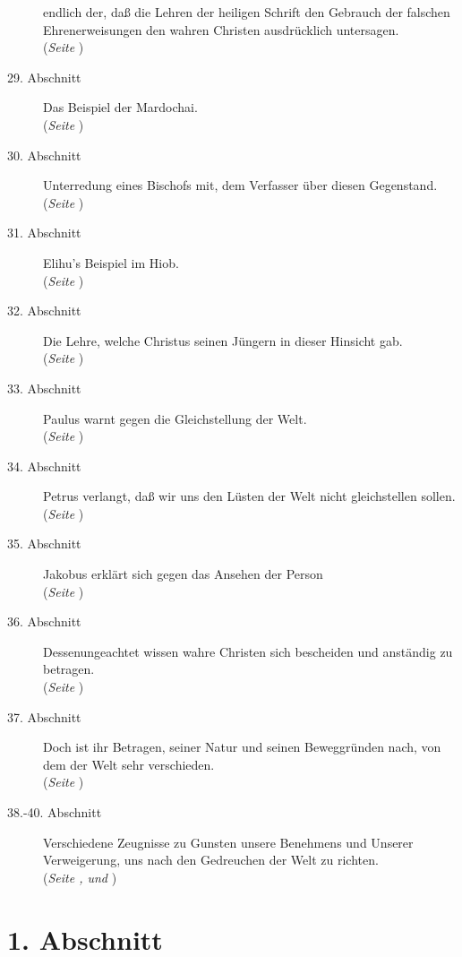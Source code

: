 \begin{description}
endlich der,
daß die Lehren der heiligen Schrift den Gebrauch der falschen Ehrenerweisungen
den wahren Christen ausdrücklich untersagen.
\\ (\textit{Seite \pageref{kap9_ab28}})
\item[29. Abschnitt] Das Beispiel der Mardochai.
\\ (\textit{Seite \pageref{kap9_ab29}})
\item[30. Abschnitt] Unterredung eines Bischofs mit, dem Verfasser über diesen
Gegenstand.
\\ (\textit{Seite \pageref{kap9_ab30}})
\item[31. Abschnitt] Elihu's Beispiel im Hiob.
\\ (\textit{Seite \pageref{kap9_ab31}})
\item[32. Abschnitt] Die Lehre, welche Christus seinen Jüngern in dieser
Hinsicht gab.
\\ (\textit{Seite \pageref{kap9_ab32}})
\item[33. Abschnitt] Paulus warnt gegen die Gleichstellung der Welt.
\\ (\textit{Seite \pageref{kap9_ab33}})
\item[34. Abschnitt] Petrus verlangt, daß wir uns den Lüsten der Welt nicht
gleichstellen sollen.
\\ (\textit{Seite \pageref{kap9_ab34}})
\item[35. Abschnitt] Jakobus erklärt sich gegen das Ansehen der Person
\\ (\textit{Seite \pageref{kap9_ab35}})
\item[36. Abschnitt] Dessenungeachtet wissen wahre Christen sich bescheiden und
anständig zu betragen.
\\ (\textit{Seite \pageref{kap9_ab36}})
\item[37. Abschnitt] Doch ist ihr Betragen, seiner Natur und seinen Beweggründen
nach, von dem der Welt sehr verschieden.
\\ (\textit{Seite \pageref{kap9_ab37}})
\item[38.-40. Abschnitt] Verschiedene Zeugnisse zu Gunsten unsere Benehmens und
Unserer Verweigerung, uns nach den Gedreuchen der Welt zu richten.
\\ (\textit{Seite \pageref{kap9_ab38}, \pageref{kap9_ab39} und \pageref{kap9_ab40}})

\end{description}

\newpage 


\section{1. Abschnitt} \label{kap9_ab1}

